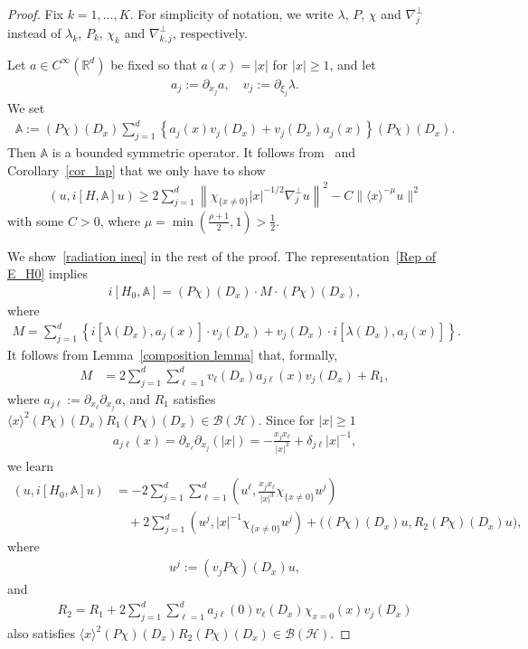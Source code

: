 \documentclass[10pt,a4paper]{amsart}
\renewcommand{\d}{\delta}
\renewcommand{\l}{\lambda}
\newcommand{\x}{\xi}
\newcommand{\R}{\mathbb{R}}
\newcommand{\bbA}{\mathbb{A}}
\newcommand{\HS}{\mathcal{H}}
\newcommand{\BS}{\mathcal{B}}
\newcommand{\jap}[1]{\langle #1 \rangle}
\begin{document}
\begin{proof}
Fix $k=1,\dots,K$. For simplicity of notation, we write $\l$, $P$, $\chi$ and $\nabla_j^\perp$ instead of $\l_k$, $P_k$, $\chi_k$ and $\nabla_{k,j}^\perp$, respectively.

Let $a\in C^\infty(\R^d)$ be fixed so that $a(x)=|x|$ for $|x|\geq1$, and let
\begin{align*}
a_j:=\partial_{x_j}a, \quad v_j:=\partial_{\x_j}\l.
\end{align*}
We set
\begin{align*}
\bbA := (P\chi)(D_x) \sum_{j=1}^d \left\{a_j(x)v_j(D_x)+v_j(D_x)a_j(x) \right\} (P\chi)(D_x).
\end{align*}
Then $\bbA$ is a bounded symmetric operator. It follows from~\cite[Proposition~0.5.11]{Y} and Corollary~\ref{cor_lap} that we only have to show
\begin{align}\label{radiation ineq}
\left(u, i[H,\bbA]u\right)
\geq 2\sum_{j=1}^d \left\| \chi_{\{x\neq0\}}|x|^{-1/2} \nabla_{j}^\perp u \right\|^2 -C\|\jap{x}^{-\mu}u\|^2
\end{align}
with some $C>0$, where $\mu=\min(\frac{\rho+1}{2},1)>\frac12$.

We show~\eqref{radiation ineq} in the rest of the proof. The representation~\eqref{Rep of E_H0} implies
\begin{align*}
i[H_0,\bbA] = (P\chi)(D_x) \cdot M \cdot (P\chi)(D_x),
\end{align*}
where
\begin{align*}
M = \sum_{j=1}^d \left\{i\left[\l(D_x),a_j(x)\right] \cdot v_j(D_x) + v_j(D_x) \cdot i\left[\l(D_x),a_j(x)\right] \right\}.
\end{align*}
It follows from Lemma~\ref{composition lemma} that, formally,
\begin{align*}
M &= 2 \sum_{j=1}^d \sum_{\ell=1}^d v_\ell(D_x)a_{j\ell}(x) v_j(D_x) + R_1,
\end{align*}
where $a_{j\ell}:=\partial_{x_\ell}\partial_{x_j}a$, and $R_1$ satisfies $\jap{x}^2 (P\chi)(D_x) R_1 (P\chi)(D_x) \in \BS(\HS)$. Since for $|x|\geq1$
\begin{align*}
a_{j\ell}(x) = \partial_{x_\ell}\partial_{x_j}\left(|x|\right) = -\frac{x_j x_\ell}{|x|^3} + \d_{j\ell} |x|^{-1},
\end{align*}
we learn
\begin{equation}\label{radiation pf commutator}
\begin{split}
(u,i[H_0,\bbA]u) 
&= -2 \sum_{j=1}^d \sum_{\ell=1}^d \left(u^\ell, \frac{x_j x_\ell}{|x|^3} \chi_{\{x\neq0\}} u^j\right) \\
&\quad+2 \sum_{j=1}^d \left(u^j, |x|^{-1}\chi_{\{x\neq0\}}u^j\right)
 + \bigl((P\chi)(D_x)u, R_2 (P\chi)(D_x)u\bigr), 
\end{split}
\end{equation}
where
\begin{align*}
u^j:= (v_j P\chi)(D_x) u,
\end{align*}
and
\begin{align*}
R_2= R_1 + 2 \sum_{j=1}^d \sum_{\ell=1}^d a_{j\ell}(0) v_\ell(D_x) \chi_{x=0}(x) v_j(D_x)
\end{align*}
also satisfies $\jap{x}^2 (P\chi)(D_x) R_2 (P\chi)(D_x) \in \BS(\HS)$.


\end{proof}
\end{document}
